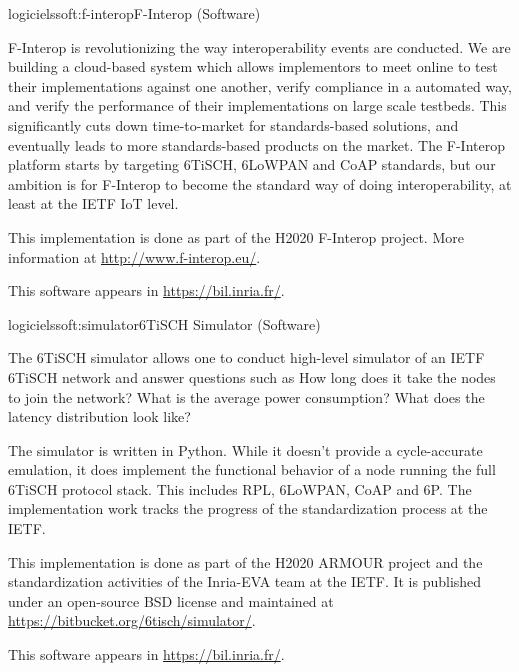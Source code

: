 \documentclass{ra2016}
\begin{document}
\begin{module}{logiciels}{soft:f-interop}{F-Interop (Software)}
\label{soft:f-interop}

\begin{participants}
\end{participants}

F-Interop is revolutionizing the way interoperability events are conducted.
We are building a cloud-based system which allows implementors to meet online to test their implementations against one another, verify compliance in a automated way, and verify the performance of their implementations on large scale testbeds.
This significantly cuts down time-to-market for standards-based solutions, and eventually leads to more standards-based products on the market.
The F-Interop platform starts by targeting 6TiSCH, 6LoWPAN and CoAP standards, but our ambition is for F-Interop to become the standard way of doing interoperability, at least at the IETF IoT level.

This implementation is done as part of the H2020 F-Interop project.
More information at \url{http://www.f-interop.eu/}.

This software appears in \url{https://bil.inria.fr/}.

\end{module}

\begin{module}{logiciels}{soft:simulator}{6TiSCH Simulator (Software)}

\begin{participants}
\end{participants}

The 6TiSCH simulator allows one to conduct high-level simulator of an IETF 6TiSCH network and answer questions such as
How long does it take the nodes to join the network?
What is the average power consumption?
What does the latency distribution look like?

The simulator is written in Python.
While it doesn't provide a cycle-accurate emulation, it does implement the functional behavior of a node running the full 6TiSCH protocol stack.
This includes RPL, 6LoWPAN, CoAP and 6P. The implementation work tracks the progress of the standardization process at the IETF.

This implementation is done as part of the H2020 ARMOUR project and the standardization activities of the Inria-EVA team at the IETF.
It is published under an open-source BSD license and maintained at \url{https://bitbucket.org/6tisch/simulator/}.

This software appears in \url{https://bil.inria.fr/}.

\end{module}
\end{document}
